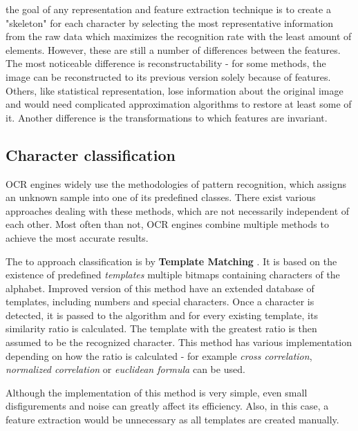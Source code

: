  the goal of any representation and feature extraction technique is to create a "skeleton" for each character by selecting the most representative information from the raw data which maximizes the recognition rate with the least amount of elements. However, these are still a number of differences between the features. The most noticeable difference is reconstructability - for some methods, the image can be reconstructed to its previous version solely because of features. Others, like statistical representation, lose information about the original image and would need complicated approximation algorithms to restore at least some of it. Another difference is the transformations to which features are invariant.

\subsection{Character classification}

OCR engines widely use the methodologies of pattern recognition, which assigns an unknown sample into one of its predefined classes. There exist various approaches dealing with these methods, which are not necessarily independent of each other. Most often than not, OCR engines combine multiple methods to achieve the most accurate results.

The  to approach classification is by \textbf{Template Matching} \citep{templateMatching}. It is based on the existence of predefined \emph{templates} \xxx{-} multiple bitmaps containing characters of the alphabet. Improved version of this method have an extended database of templates, including numbers and special characters. Once a character is detected, it is passed to the algorithm and for every existing template, its similarity ratio is calculated. The template with the greatest ratio is then assumed to be the recognized character. This method has various implementation depending on how the ratio is calculated - for example \emph{cross correlation}, \emph{normalized correlation} or \emph{euclidean formula} can be used.

Although the implementation of this method is very simple, even small disfigurements and noise can greatly affect its efficiency. Also, in this case, a feature extraction would be unnecessary as all templates are created manually.

